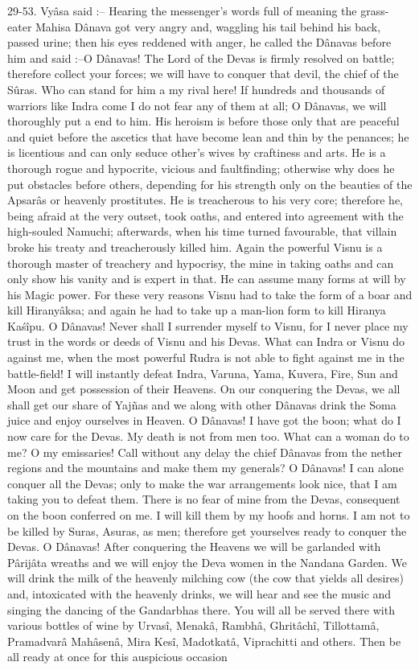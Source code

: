 29-53. Vy\^asa said :-- Hearing the messenger's words full of meaning the grass-eater Mahisa D\^anava got very angry and, waggling his tail behind his back, passed urine; then his eyes reddened with anger, he called the D\^anavas before him and said :--O D\^anavas! The Lord of the Devas is firmly resolved on battle; therefore collect your forces; we will have to conquer that devil, the chief of the S\^uras. Who can stand for him a my rival here! If hundreds and thousands of warriors like Indra come I do not fear any of them at all; O D\^anavas, we will thoroughly put a end to him. His heroism is before those only that are peaceful and quiet before the ascetics that have become lean and thin by the penances; he is licentious and can only seduce other's wives by craftiness and arts. He is a thorough rogue and hypocrite, vicious and faultfinding; otherwise why does he put obstacles before others, depending for his strength only on the beauties of the Apsar\^as or heavenly prostitutes. He is treacherous to his very core; therefore he, being afraid at the very outset, took oaths, and entered into agreement with the high-souled Namuchi; afterwards, when his time turned favourable, that villain broke his treaty and treacherously killed him. Again the powerful Visnu is a thorough master of treachery and hypocrisy, the mine in taking oaths and can only show his vanity and is expert in that. He can assume many forms at will by his Magic power. For these very reasons Visnu had to take the form of a boar and kill Hirany\^aksa; and again he had to take up a man-lion form to kill Hiranya Ka\'s\^ipu. O D\^anavas! Never shall I surrender myself to Visnu, for I never place my trust in the words or deeds of Visnu and his Devas. What can Indra or Visnu do against me, when the most powerful Rudra is not able to fight against me in the battle-field! I will instantly defeat Indra, Varuna, Yama, Kuvera, Fire, Sun and Moon and get possession of their Heavens. On our conquering the Devas, we all shall get our share of Yajñas and we along with other D\^anavas drink the Soma juice and enjoy ourselves in Heaven. O D\^anavas! I have got the boon; what do I now care for the Devas. My death is not from men too. What can a woman do to me? O my emissaries! Call without any delay the chief D\^anavas from the nether regions and the mountains and make them my generals? O D\^anavas! I can alone conquer all the Devas; only to make the war arrangements look nice, that I am taking you to defeat them. There is no fear of mine from the Devas, consequent on the boon conferred on me. I will kill them by my hoofs and horns. I am not to be killed by Suras, Asuras, as men; therefore get yourselves ready to conquer the Devas. O D\^anavas! After conquering the Heavens we will be garlanded with P\^arij\^ata wreaths and we will enjoy the Deva women in the Nandana Garden. We will drink the milk of the heavenly milching cow (the cow that yields all desires) and, intoxicated with the heavenly drinks, we will hear and see the music and singing the dancing of the Gandarbhas there. You will all be served there with various bottles of wine by Urvas\^i, Menak\^a, Rambh\^a, Ghrit\^ach\^i, Tillottam\^a, Pramadvar\^a Mah\^asen\^a, Mira Kes\^i, Madotkat\^a, Viprachitti and others. Then be all ready at once for this auspicious occasion 